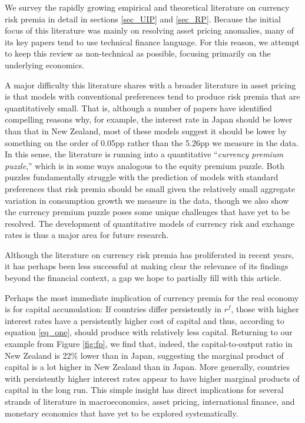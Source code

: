 \documentclass{ar-1col}
\begin{document}
We survey the rapidly growing empirical and theoretical literature on currency risk premia in detail in sections \ref{sec_UIP} and \ref{sec_RP}. Because the initial focus of this literature was mainly on resolving asset pricing anomalies, many of its key papers tend to use technical finance language. For this reason, we attempt to keep this review as non-technical as possible, focusing primarily on the underlying economics.

A major difficulty this literature shares with a broader literature in asset pricing is that models with conventional preferences tend to produce risk premia that are quantitatively small. That is, although a number of papers have identified compelling reasons why, for example, the interest rate in Japan should be lower than that in New Zealand, most of these models suggest it should be lower by something on the order of 0.05pp rather than the 5.26pp we measure in the data. In this sense, the literature is running into a quantitative ``\textit{currency premium puzzle},'' which is in some ways analogous to the equity premium puzzle. Both puzzles fundamentally struggle with the prediction of models with standard preferences that risk premia should be small given the relatively small aggregate variation in consumption growth we measure in the data, though we also show the currency premium puzzle poses some unique challenges that have yet to be resolved. The development of quantitative models of currency risk and exchange rates is thus a major area for future research.

Although the literature on currency risk premia has proliferated in recent years, it has perhaps been less successful at making clear the relevance of its findings beyond the financial context, a gap we hope to partially fill with this article.

Perhaps the most immediate implication of currency premia for the real economy is for capital accumulation: If countries differ persistently in $r^f$, those with higher interest rates have a persistently higher cost of capital and thus, according to equation \ref{eq_one}, should produce with relatively less capital. Returning to our example from Figure \ref{fig:fp}, we find that, indeed, the capital-to-output ratio in New Zealand is 22\% lower than in Japan, suggesting the marginal product of capital is a lot higher in New Zealand than in Japan. More generally, countries with persistently higher interest rates appear to have higher marginal products of capital in the long run. This simple insight has direct implications for several strands of literature in macroeconomics, asset pricing, international finance, and monetary economics that have yet to be explored systematically.
\end{document}
